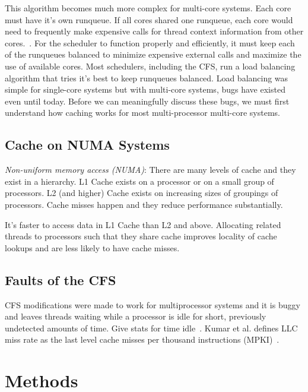 \documentclass{sig-alternate}
\begin{document}
This algorithm becomes much more complex for multi-core systems. Each core must have it's own runqueue. If all cores shared one runqueue, each core would need to frequently make expensive calls for thread context information from other cores.~\cite{Lozi:2016}. For the scheduler to function properly and efficiently, it must keep each of the runqueues balanced to minimize expensive external calls and maximize the use of available cores. Most schedulers, including the CFS, run a load balancing algorithm that tries it's best to keep runqueues balanced. Load balancing was simple for single-core systems but with multi-core systems, bugs have existed even until today. Before we can meaningfully discuss these bugs, we must first understand how caching works for most multi-processor multi-core systems.

\subsection{Cache on NUMA Systems}
\label{sec:cache}

\emph{Non-uniform memory access (NUMA)}:
There are many levels of cache and they exist in a hierarchy. L1 Cache exists on a processor or on a small group of processors. L2 (and higher) Cache exists on increasing sizes of groupings of processors.
Cache misses happen and they reduce performance substantially.

It's faster to access data in L1 Cache than L2 and above. Allocating related threads to processors such that they share cache improves locality of cache lookups and are less likely to have cache misses.


\subsection{Faults of the CFS}
\label{sec:cfsfaults}

CFS modifications were made to work for multiprocessor systems and it is buggy and leaves threads waiting while a processor is idle for short, previously undetected amounts of time. Give stats for time idle~\cite{Lozi:2016}. Kumar et al. defines LLC miss rate as the last level cache misses per thousand instructions (MPKI)~\cite{KumarEtal:2014}.

\section{Methods}
\label{sec:methods}
\end{document}
